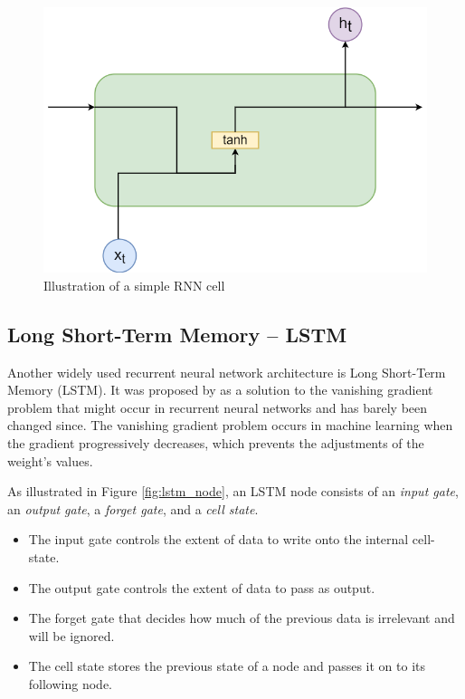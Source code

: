 \documentclass[nofilelist]{cslthse-msc}
\begin{document}
 \begin{figure}[H]
    \centering
    \includegraphics[scale=0.35]{msccls/explanatory_images/rnn.png}
    \caption{Illustration of a simple RNN cell}
    \label{fig:rnn_node}
\end{figure}



\subsection{Long Short-Term Memory -- LSTM}
\label{LSTM}

Another widely used recurrent neural network architecture is Long Short-Term Memory (LSTM). It was proposed by \citet{hochreiter1997} as a solution to the vanishing gradient problem that might occur in recurrent neural networks and has barely been changed since. The vanishing gradient problem occurs in machine learning when the gradient progressively decreases, which prevents the adjustments of the weight's values. 


As illustrated in Figure \ref{fig:lstm_node}, an LSTM node consists of an \textit{input gate}, an \textit{output gate}, a \textit{forget gate}, and a \textit{cell state}. 
\begin{itemize}
    \item The input gate controls the extent of data to write onto the internal cell-state.
    \item The output gate controls the extent of data to pass as output. 
    \item The forget gate that decides how much of the previous data is irrelevant and will be ignored. 
    \item The cell state stores the previous state of a node and passes it on to its following node. 
\end{itemize}
\end{document}
